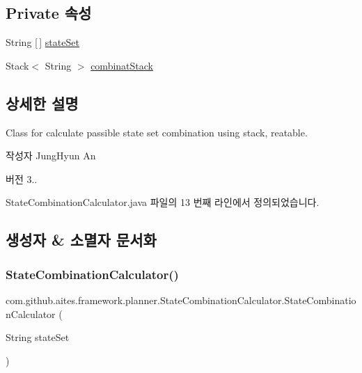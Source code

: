 \subsection*{Private 속성}
\begin{DoxyCompactItemize}
\item 
String \mbox{[}$\,$\mbox{]} \mbox{\hyperlink{classcom_1_1github_1_1aites_1_1framework_1_1planner_1_1_state_combination_calculator_af0002d5e5c2d3034f606f4586d7796a8}{state\+Set}}
\item 
Stack$<$ String $>$ \mbox{\hyperlink{classcom_1_1github_1_1aites_1_1framework_1_1planner_1_1_state_combination_calculator_a9c0cc6dedc79509276f6afd36ffbfa6c}{combinat\+Stack}}
\end{DoxyCompactItemize}


\subsection{상세한 설명}
Class for calculate passible state set combination using stack, reatable. 

\begin{DoxyAuthor}{작성자}
Jung\+Hyun An 
\end{DoxyAuthor}
\begin{DoxyVersion}{버전}
3.. 
\end{DoxyVersion}


State\+Combination\+Calculator.\+java 파일의 13 번째 라인에서 정의되었습니다.



\subsection{생성자 \& 소멸자 문서화}
\mbox{\label{classcom_1_1github_1_1aites_1_1framework_1_1planner_1_1_state_combination_calculator_a5c7bde442e7bc135147c46d66a448d1a}} 
\subsubsection{\texorpdfstring{State\+Combination\+Calculator()}{StateCombinationCalculator()}}
{\footnotesize\ttfamily com.\+github.\+aites.\+framework.\+planner.\+State\+Combination\+Calculator.\+State\+Combination\+Calculator (\begin{DoxyParamCaption}\item[{String}]{state\+Set }\end{DoxyParamCaption})}



